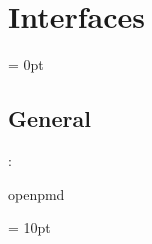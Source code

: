 
\section{Interfaces} 


\parskip = 0pt

\vspace{3mm} \subsection*{General}

: 

openpmd
\vspace{2mm}

\vspace{5mm}\parskip = 10pt 
